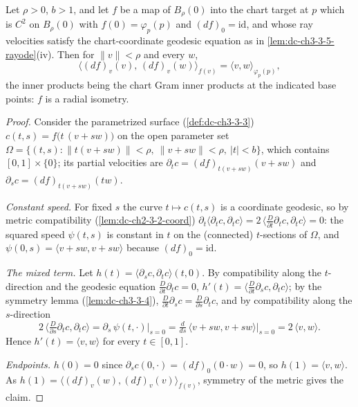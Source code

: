 \begin{lemma}
  \label{lem:dc-ch3-3-5-surface}
  \leanok
  Let $\rho > 0$, $b > 1$, and let $f$ be a map of $B_\rho(0)$ into the chart
  target at $p$ which is $C^2$ on $B_\rho(0)$ with $f(0) = \varphi_p(p)$ and
  $(df)_0 = \mathrm{id}$, and whose ray velocities satisfy the
  chart-coordinate geodesic equation as in \cref{lem:dc-ch3-3-5-rayode}(iv).
  Then for $\|v\| < \rho$ and every $w$,
  $$\big\langle (df)_v(v),\, (df)_v(w) \big\rangle_{f(v)}
    = \langle v, w\rangle_{\varphi_p(p)},$$
  the inner products being the chart Gram inner products at the indicated
  base points: $f$ is a radial isometry.
\end{lemma}
\begin{proof}
  \sketch
  \leanok
  Consider the parametrized surface (\cref{def:dc-ch3-3-3})
  $c(t,s) = f\big(t\,(v + s w)\big)$ on the open parameter set
  $\Omega = \{(t,s) : \|t(v+sw)\| < \rho,\ \|v+sw\| < \rho,\ |t| < b\}$,
  which contains $[0,1] \times \{0\}$; its partial velocities are
  $\partial_t c = (df)_{t(v+sw)}(v+sw)$ and $\partial_s c = (df)_{t(v+sw)}(tw)$.

  \emph{Constant speed.} For fixed $s$ the curve $t \mapsto c(t,s)$ is a
  coordinate geodesic, so by metric compatibility
  (\cref{lem:dc-ch2-3-2-coord})
  $\partial_t \langle \partial_t c, \partial_t c\rangle
  = 2\,\langle \tfrac{D}{\partial t}\partial_t c, \partial_t c\rangle = 0$:
  the squared speed $\psi(t,s)$ is constant in $t$ on the (connected)
  $t$-sections of $\Omega$, and $\psi(0,s) = \langle v+sw, v+sw\rangle$
  because $(df)_0 = \mathrm{id}$.

  \emph{The mixed term.} Let
  $h(t) = \langle \partial_s c, \partial_t c\rangle(t,0)$. By compatibility
  along the $t$-direction and the geodesic equation
  $\tfrac{D}{\partial t}\partial_t c = 0$,
  $h'(t) = \langle \tfrac{D}{\partial t}\partial_s c, \partial_t c\rangle$;
  by the symmetry lemma (\cref{lem:dc-ch3-3-4}),
  $\tfrac{D}{\partial t}\partial_s c = \tfrac{D}{\partial s}\partial_t c$,
  and by compatibility along the $s$-direction
  $$2\,\big\langle \tfrac{D}{\partial s}\partial_t c, \partial_t c\big\rangle
    = \partial_s\, \psi(t, \cdot)\big|_{s=0}
    = \tfrac{d}{ds}\,\langle v+sw, v+sw\rangle\big|_{s=0}
    = 2\,\langle v, w\rangle.$$
  Hence $h'(t) = \langle v, w\rangle$ for every $t \in [0,1]$.

  \emph{Endpoints.} $h(0) = 0$ since
  $\partial_s c(0, \cdot) = (df)_0(0 \cdot w) = 0$, so
  $h(1) = \langle v, w\rangle$. As
  $h(1) = \langle (df)_v(w), (df)_v(v)\rangle_{f(v)}$, symmetry of the
  metric gives the claim.
\end{proof}

